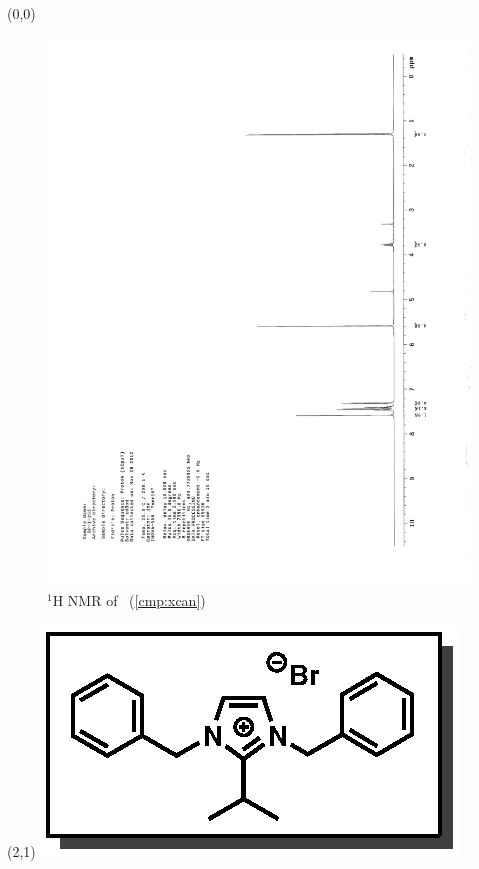 \begin{textblock}{20}(0,0)
\begin{figure}[htb]
\caption{$^1$H NMR of \CMPxcan\ (\ref{cmp:xcan})}
\includegraphics[scale=0.75, trim = 0mm 0mm 0mm 5mm,
clip]{chp_alkylation/images/nmr/xcanH}
\vspace{-100pt}
\end{figure}
\end{textblock}
\begin{textblock}{1}(2,1)
\includegraphics[scale=0.8, angle=90]{chp_alkylation/images/xcan}
\end{textblock}
